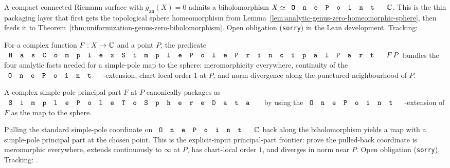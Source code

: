 \begin{lemma}
\label{lem:exists-biholomorph-analyticgenus-zero}
A compact connected Riemann surface with \(g_{\mathrm{an}}(X)=0\) admits a
biholomorphism \(X\simeq\code{OnePoint}\,\C\). This is the thin packaging
layer that first gets the topological sphere homeomorphism from
Lemma~\ref{lem:analytic-genus-zero-homeomorphic-sphere}, then feeds it to
Theorem~\ref{thm:uniformization-genus-zero-biholomorphism}. Open obligation
(\lstinline{sorry}) in the Lean development.
Tracking: .
\end{lemma}

\begin{definition}
\label{def:complex-simple-pole-principal-part}
For a complex function \(F:X\to\mathbb{C}\) and a point \(P\), the predicate
\(\code{HasComplexSimplePolePrincipalPart}\,F\,P\) bundles the four analytic
facts needed for a simple-pole map to the sphere: meromorphicity everywhere,
continuity of the \(\code{OnePoint}\)-extension, chart-local order \(1\) at
\(P\), and norm divergence along the punctured neighbourhood of \(P\).
\leanok
\end{definition}

\begin{definition}
\label{def:simple-pole-to-sphere-data-of-complex-principal-part}
A complex simple-pole principal part \(F\) at \(P\) canonically packages as
\(\code{SimplePoleToSphereData}\) by using the \(\code{OnePoint}\)-extension of
\(F\) as the map to the sphere.
\leanok
\end{definition}

\begin{lemma}
\label{lem:complex-simple-pole-principal-part-biholomorph}
Pulling the standard simple-pole coordinate on \(\code{OnePoint}\,\C\) back along
the biholomorphism yields a map with a simple-pole principal part at the chosen
point. This is the explicit-input principal-part frontier: prove the pulled-back
coordinate is meromorphic everywhere, extends continuously to \(\infty\) at
\(P\), has chart-local order \(1\), and diverges in norm near \(P\). Open
obligation (\lstinline{sorry}).
Tracking: .
\end{lemma}

